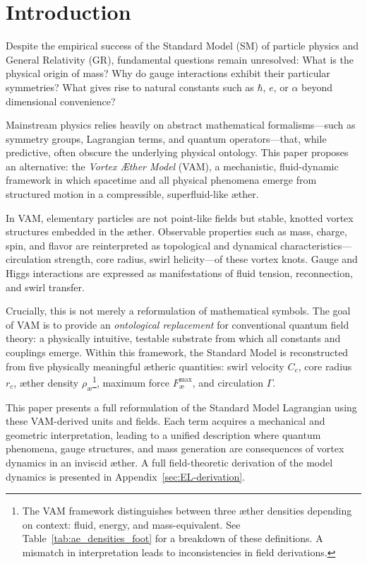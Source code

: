 \section{Introduction}\label{sec:inleiding}

Despite the empirical success of the Standard Model (SM) of particle physics and General Relativity (GR), fundamental questions remain unresolved: What is the physical origin of mass? Why do gauge interactions exhibit their particular symmetries? What gives rise to natural constants such as $\hbar$, $e$, or $\alpha$ beyond dimensional convenience?

Mainstream physics relies heavily on abstract mathematical formalisms—such as symmetry groups, Lagrangian terms, and quantum operators—that, while predictive, often obscure the underlying physical ontology. This paper proposes an alternative: the \emph{Vortex Æther Model} (VAM), a mechanistic, fluid-dynamic framework in which spacetime and all physical phenomena emerge from structured motion in a compressible, superfluid-like æther.

In VAM, elementary particles are not point-like fields but stable, knotted vortex structures embedded in the æther. Observable properties such as mass, charge, spin, and flavor are reinterpreted as topological and dynamical characteristics—circulation strength, core radius, swirl helicity—of these vortex knots. Gauge and Higgs interactions are expressed as manifestations of fluid tension, reconnection, and swirl transfer.

Crucially, this is not merely a reformulation of mathematical symbols. The goal of VAM is to provide an \emph{ontological replacement} for conventional quantum field theory: a physically intuitive, testable substrate from which all constants and couplings emerge. Within this framework, the Standard Model is reconstructed from five physically meaningful ætheric quantities: swirl velocity $C_e$, core radius $r_c$, æther density $\rho_\text{\ae}$\footnote{The VAM framework distinguishes between three æther densities depending on context: fluid, energy, and mass-equivalent. See Table~\ref{tab:ae_densities_foot} for a breakdown of these definitions. A mismatch in interpretation leads to inconsistencies in field derivations.}, maximum force $F^{\text{max}}_{\text{\ae}}$, and circulation $\Gamma$.

This paper presents a full reformulation of the Standard Model Lagrangian using these VAM-derived units and fields. Each term acquires a mechanical and geometric interpretation, leading to a unified description where quantum phenomena, gauge structures, and mass generation are consequences of vortex dynamics in an inviscid æther. A full field-theoretic derivation of the model dynamics is presented in Appendix~\ref{sec:EL-derivation}.

